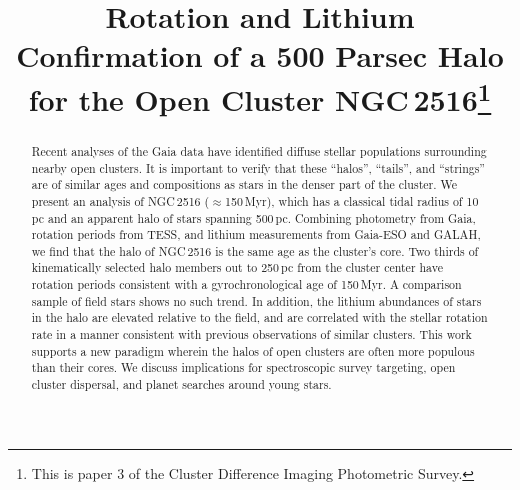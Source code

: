 \documentclass[12pt,twocolumn,tighten]{aastex63}
\begin{document}

\title{
  Rotation and Lithium Confirmation of a 500 Parsec Halo for the Open
  Cluster NGC\,2516\footnote{This is paper 3 of the Cluster Difference
  Imaging Photometric Survey.}
}



%
%
\begin{abstract}
  Recent analyses of the Gaia data have identified diffuse stellar
  populations surrounding nearby open clusters.  It is important to
  verify that these ``halos'', ``tails'', and ``strings'' are of
  similar ages and compositions as stars in the denser part of the
  cluster.  We present an analysis of NGC\,2516 ($\approx$150\,Myr),
  which has a classical tidal radius of 10\,pc and an apparent halo of
  stars spanning 500\,pc.  Combining photometry from Gaia, rotation
  periods from TESS, and lithium measurements from Gaia-ESO and GALAH,
  we find that the halo of NGC\,2516 is the same age as the cluster's
  core.  Two thirds of kinematically selected halo members out to
  250\,pc from the cluster center have rotation periods consistent
  with a gyrochronological age of 150\,Myr.  A comparison sample of
  field stars shows no such trend.  In addition, the lithium
  abundances of stars in the halo are elevated relative to the field,
  and are correlated with the stellar rotation rate in a manner
  consistent with previous observations of similar clusters.  This
  work supports a new paradigm wherein the halos of open clusters are
  often more populous than their cores.  We discuss implications for
  spectroscopic survey targeting, open cluster dispersal, and planet
  searches around young stars.
\end{abstract}


\end{document}
